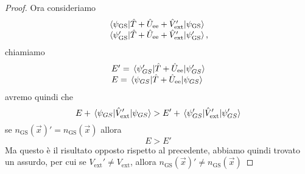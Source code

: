 \begin{proof}
    Ora consideriamo
    \begin{equation*}
        \begin{array}{l}
            \mel{\psi_{\text{GS}}}{\hat T+ \hat U_{\text{ee}}+\hat V_{\text{ext}}'}{\psi_{\text{GS}}} \\
            \mel{\psi_{\text{GS}}'}{\hat T+ \hat U_{\text{ee}}+\hat V_{\text{ext}}'}{\psi_{\text{GS}}'},
        \end{array}
    \end{equation*}
    chiamiamo
    \begin{equation*}
        \begin{array}{l}
            E'=\mel{\psi_{GS}'}{\hat T + \hat U_{\text{ee}}}{\psi_{GS}'} \\
            E=\mel{\psi_{GS}}{\hat T + \hat U_{\text{ee}}}{\psi_{GS}}
        \end{array}
    \end{equation*}
    avremo quindi che
    \begin{equation*}
        E+\mel{\psi_{GS}}{\hat V_{\text{ext}}'}{\psi_{GS}} > E'+\mel{\psi_{GS}'}{\hat V_{\text{ext}}'}{\psi_{GS}'}
    \end{equation*}
    se $n_{\text{GS}}(\vec x)' = n_{\text{GS}}(\vec x)$  allora
    \begin{equation*}
        E > E'
    \end{equation*}
    Ma questo è il risultato opposto rispetto al precedente, abbiamo quindi trovato un assurdo, per cui se $V_{\text{ext}}'\neq V_{\text{ext}}$, allora $n_{\text{GS}}(\vec x)'\neq n_{\text{GS}}(\vec x)$
\end{proof}